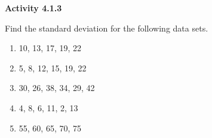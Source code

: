  \vspace{1ex}
\noindent\textbf{Activity 4.1.3}

\vspace{0.75ex}

Find the standard deviation for the following data sets.
\begin{multicols}{2}
\begin{enumerate}[noitemsep, label = \color{blue}\arabic*. ]
    \item 10, 13, 17, 19, 22
    \item 5, 8, 12, 15, 19, 22
    \item 30, 26, 38, 34, 29, 42
    \item 4, 8, 6, 11, 2, 13
    \item 55, 60, 65, 70, 75
\end{enumerate}
\end{multicols}
